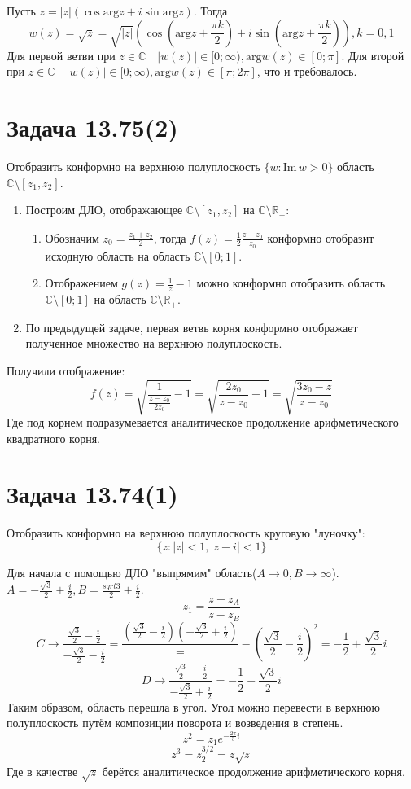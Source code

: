 \documentclass[11pt]{article}
\begin{document}
Пусть \(z = |z|(\cos\mathrm{arg}z + i\sin\mathrm{arg}z)\). Тогда
$$w(z) = \sqrt z = \sqrt{|z|}\left(\cos\left(\mathrm{arg} z + \frac{\pi k}2\right) + i\sin\left(\mathrm{arg} z + \frac{\pi k}2\right)\right), k = 0, 1$$
Для первой ветви при \(z \in \mathbb{C}\quad |w(z)| \in [0; \infty), \mathrm{arg} w(z) \in [0; \pi]\). Для второй при
\(z \in \mathbb{C}\quad |w(z)| \in [0; \infty), \mathrm{arg} w(z) \in [\pi; 2\pi]\), что и требовалось.
\section{Задача 13.75(2)}
\label{sec:org4fa0c84}
Отобразить конформно на верхнюю полуплоскость \(\{w: \mathrm{Im}\,w > 0\}\) область \(\mathbb{C} \setminus [z_1, z_2]\).

\begin{enumerate}
\item Построим ДЛО, отображающее \(\mathbb{C} \setminus [z_1, z_2]\) на \(\mathbb{C} \setminus \mathbb{R}_+\):
\begin{enumerate}
\item Обозначим \(z_0 = \frac{z_1 + z_2}2\), тогда \(f(z) = \frac{1}2\frac{z - z_0}{z_0}\) конформно отобразит исходную область на область \(\mathbb{C} \setminus [0; 1]\).
\item Отображением \(g(z) = \frac{1}z - 1\) можно конформно отобразить область \(\mathbb{C} \setminus [0; 1]\) на область \(\mathbb{C} \setminus \mathbb{R}_+\).
\end{enumerate}
\item По предыдущей задаче, первая ветвь корня конформно отображает полученное множество на верхнюю полуплоскость.
\end{enumerate}

Получили отображение:
$$f(z) = \sqrt{\frac{1}{\frac{z - z_0}{2z_0}} - 1} = \sqrt{\frac{2z_0}{z - z_0} - 1} = \sqrt{\frac{3z_0 - z}{z - z_0}}$$
Где под корнем подразумевается аналитическое продолжение арифметического квадратного корня.
\section{Задача 13.74(1)}
\label{sec:orge1da32f}
Отобразить конформно на верхнюю полуплоскость круговую "луночку":
$$\{z: |z| < 1, |z - i| < 1\}$$

Для начала с помощью ДЛО "выпрямим" область(\(A \to 0, B \to \infty\)).
\(A = -\frac{\sqrt 3}2  + \frac{i}2, B = \frac{sqrt 3}2 + \frac{i}2\).
$$z_1 = \frac{z - z_A}{z - z_B}$$
$$C \to \frac{\frac{\sqrt 3}2 - \frac{i}2}{-\frac{\sqrt 3}2 - \frac{i}2} = \frac{(\frac{\sqrt 3}2 - \frac{i}2)(-\frac{\sqrt 3}2 + \frac{i}2)}
= -\left(\frac{\sqrt 3}2 - \frac{i}2\right)^2 = -\frac{1}2 + \frac{\sqrt 3}2i$$
$$D \to \frac{\frac{\sqrt 3}2 + \frac{i}2}{-\frac{\sqrt 3}2 + \frac{i}2} = -\frac{1}2 - \frac{\sqrt 3}2i$$
Таким образом, область перешла в угол. Угол можно перевести в верхнюю полуплоскость путём композиции поворота и возведения в степень.
$$z^2 = z_1e^{-\frac{2\pi}3i}$$
$$z^3 = z_2^{3/2} = z\sqrt z$$
Где в качестве \(\sqrt z\) берётся аналитическое продолжение арифметического корня.
\end{document}

